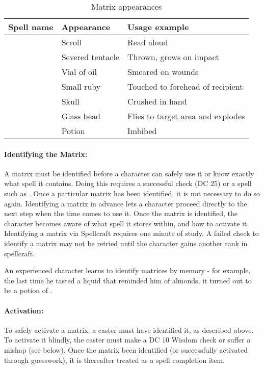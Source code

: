 \begin{table*}
\caption{Matrix appearances}
\label{tab:MatrixAppearances}
\centering
\begin{tabular}{lll}
\toprule
\textbf{Spell name}&\textbf{Appearance}&\textbf{Usage example}\\
\midrule
\nameref{Spell:AlignedProtection}&Scroll	&Read aloud\\
\nameref{Spell:BlackTentacles}	&Severed tentacle&Thrown, grows on impact\\
\nameref{Spell:CureWounds}	&Vial of oil 	&Smeared on wounds\\
\nameref{Spell:CureWounds}	&Small ruby 	&Touched to forehead of recipient\\
\nameref{Spell:DivinePower}	&Skull		&Crushed in hand\\
\nameref{Spell:Fireball}	&Glass bead	&Flies to target area and explodes\\
\nameref{Spell:RemoveDisease}	&Potion		&Imbibed\\
\bottomrule
\end{tabular}
\end{table*}

\paragraph{Identifying the Matrix:} 
A matrix must be identified before a character can safely use it or know exactly what spell it contains. 
Doing this requires a successful  check (DC 25) or a spell such as . 
Once a particular matrix has been identified, it is not necessary to do so again. 
Identifying a matrix in advance lets a character proceed directly to the next step when the time comes to use it.
Once the matrix is identified, the character becomes aware of what spell it stores within, and how to activate it. 
Identifying a matrix via Spellcraft requires one minute of study.
A failed check to identify a matrix may not be retried until the character gains another rank in spellcraft.

An experienced character learns to identify matrices by memory - for example, the last time he tasted a liquid that reminded him of almonds, it turned out to be a potion of .

\paragraph{Activation:} 
To safely activate a matrix, a caster must have identified it, as described above.
To activate it blindly, the caster must make a DC 10 Wisdom check or suffer a mishap (see below).
Once the matrix been identified (or successfully activated through guesswork), it is thereafter treated as a spell completion item.

